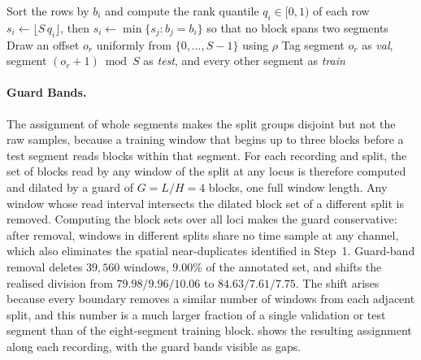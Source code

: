 \begin{algorithm}[!htbp]
	\caption{Blocked partitioning of one Tomasov recording with guard bands.}
	\label{alg:blocked}
	\DontPrintSemicolon
	Sort the rows by $b_i$ and compute the rank quantile $q_i \in [0, 1)$ of each row\;
	$s_i \leftarrow \lfloor S\, q_i \rfloor$, then $s_i \leftarrow \min\{s_j : b_j = b_i\}$ so that no block spans two segments\;
	Draw an offset $o_r$ uniformly from $\{0, \dots, S - 1\}$ using $\rho$\;
	Tag segment $o_r$ as \textit{val}, segment $(o_r + 1) \bmod S$ as \textit{test}, and every other segment as \textit{train}\;
\end{algorithm}

\paragraph[Guard Bands]{Guard Bands.}
The assignment of whole segments makes the split groups disjoint but not the raw samples, because a training window that begins up to three blocks before a test segment reads blocks within that segment. For each recording and split, the set of blocks read by any window of the split at any locus is therefore computed and dilated by a guard of $G = L/H = 4$ blocks, one full window length. Any window whose read interval intersects the dilated block set of a different split is removed. Computing the block sets over all loci makes the guard conservative: after removal, windows in different splits share no time sample at any channel, which also eliminates the spatial near-duplicates identified in Step~1. Guard-band removal deletes $39{,}560$ windows, $9.00\%$ of the annotated set, and shifts the realised division from $79.98/9.96/10.06$ to $84.63/7.61/7.75$. The shift arises because every boundary removes a similar number of windows from each adjacent split, and this number is a much larger fraction of a single validation or test segment than of the eight-segment training block.  shows the resulting assignment along each recording, with the guard bands visible as gaps.

